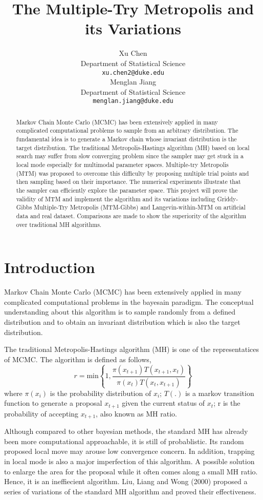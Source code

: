 \documentclass{article} %
\title{The Multiple-Try Metropolis and its Variations}
\author{
Xu Chen\\
Department of Statistical Science\\
\texttt{xu.chen2@duke.edu} \\
\And
Menglan Jiang\\
Department of Statistical Science\\
\texttt{menglan.jiang@duke.edu}
}
\begin{document}
\maketitle

\begin{abstract}
Markov Chain Monte Carlo (MCMC) has been extensively applied in many complicated computational problems to sample from an arbitrary distribution. The fundamental idea is to generate a Markov chain whose invariant distribution is the target distribution. The traditional Metropolis-Hastings algorithm (MH) based on local search may suffer from slow converging problem since the sampler may get stuck in a local mode especially for multimodal parameter spaces. Multiple-try Metropolis (MTM) was proposed to overcome this difficulty by proposing multiple trial points and then sampling based on their importance. The numerical experiments illustrate that the sampler can efficiently explore the parameter space. This project will prove the validity of MTM and implement the algorithm and its variations including Griddy-Gibbs Multiple-Try Metropolis (MTM-Gibbs) and Langevin-within-MTM on artificial data and real dataset. Comparisons are made to show the superiority of the algorithm over traditional MH algorithms.
\end{abstract}

\section{Introduction}
Markov Chain Monte Carlo (MCMC) has been extensively applied in many complicated computational problems in the bayesain paradigm. The conceptual understanding about this algorithm is to sample randomly from a defined distribution and to obtain an invariant distribution which is also the target distribution. 

The traditional Metropolis-Hastings algorithm (MH) is one of the representatices of MCMC. The algorithm is defined as follows,
\begin{equation*}
r = \text{min} \left\{ 1, \frac{\pi(x_{t+1})T(x_{t+1},x_t)}{\pi(x_{t})T(x_{t},x_{t+1})}  \right\}
\end{equation*}
where $\pi(x_i)$ is the probability distribution of $x_i$; $T(.)$ is a markov transition function to generate a proposal $x_{t+1}$ given the current status of $x_t$; r is the probability of accepting $x_{t+1}$, also known as MH ratio.

Although compared to other bayesian methods, the standard MH has already been more computational approachable, it is still of 
probablistic. Its random proposed local move may arouse low convergence concern. In addition, trapping in local mode is also a major imperfection of this algorithm. A possible solution to enlarge the area for the proposal while it often comes along a small MH ratio. Hence, it is an ineffiecient algorithm. Liu, Liang and Wong (2000) proposed a series of variations of the standard MH algorithm and proved their effectiveness. 
\end{document}
